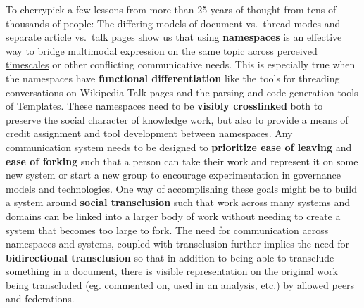 To cherrypick a few lessons from more than 25 years of thought from tens
of thousands of people: The differing models of document vs.~thread
modes and separate article vs.~talk pages show us that using
\textbf{namespaces} is an effective way to bridge multimodal expression
on the same topic across
\href{https://communitywiki.org/wiki/TimeInWikis}{perceived timescales}
or other conflicting communicative needs. This is especially true when
the namespaces have \textbf{functional differentiation}
like the tools for threading conversations on Wikipedia Talk pages and
the parsing and code generation tools of Templates. These namespaces
need to be \textbf{visibly crosslinked} both to preserve the social
character of knowledge work, but also to provide a means of credit
assignment and tool development between namespaces. Any communication
system needs to be designed to \textbf{prioritize ease of leaving} and
\textbf{ease of forking} such that a person can take their work and
represent it on some new system or start a new group to encourage
experimentation in governance models and technologies. One way of
accomplishing these goals might be to build a system around
\textbf{social transclusion} such that work across many systems and
domains can be linked into a larger body of work without needing to
create a system that becomes too large to fork. The need for
communication across namespaces and systems, coupled with transclusion
further implies the need for \textbf{bidirectional transclusion} so that
in addition to being able to transclude something in a document, there
is visible representation on the original work being transcluded (eg.
commented on, used in an analysis, etc.) by allowed peers and
federations.

